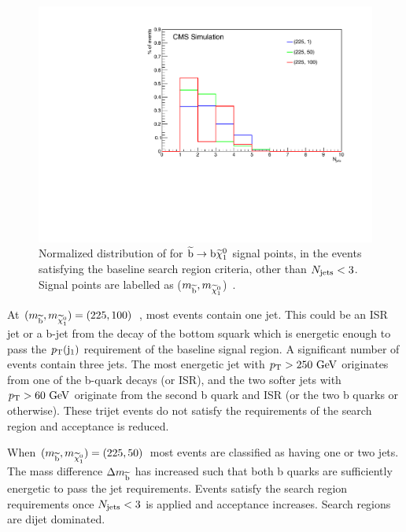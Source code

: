 \begin{figure}[!Hhtb]
  \begin{center}
  \includegraphics[scale=0.39]{Figures/sus13009/Njets_225_Norm_mod.pdf}
  \caption{Normalized distribution of \njets for $\widetilde{{\rm b}} \rightarrow {\rm b} \widetilde{\chi}^{0}_{1}$ signal points, in the events satisfying the baseline search region criteria, other than $N_{\text{jets}}<3$. Signal points are labelled as ($m_{\widetilde{{\rm b}}}, m_{\widetilde{\chi}^{0}_{1}}$)~\GeV.}
  \label{fig:sbot225njets}
  \end{center}
\end{figure}

At $(m_{\widetilde{{\rm b}}},m_{\widetilde{\chi}^{0}_{1}}) = (225, 100)$~\GeV, most events contain one jet. 
This could be an \ac{ISR} jet or a b-jet from the decay of the bottom squark which is energetic enough to pass the $p_{\text{T}}({\rm j}_1)$ requirement of the baseline signal region.
A significant number of events contain three jets. 
The most energetic jet with $p_{\text{T}}>250~\mathrm{GeV}$ originates from one of the b-quark decays (or \ac{ISR}), and the two softer jets with $p_{\text{T}}>60~\mathrm{GeV}$ originate from the second b quark and \ac{ISR} (or the two b quarks or otherwise). 
These trijet events do not satisfy the requirements of the search region and acceptance is reduced. 

When $(m_{\widetilde{{\rm b}}},m_{\widetilde{\chi}^{0}_{1}}) = (225, 50)$~\GeV most events are classified as having one or two jets. 
The mass difference $\Delta m_{\widetilde{{\rm b}}}$ has increased such that both b quarks are sufficiently energetic to pass the jet requirements. 
Events satisfy the search region requirements once $N_{\text{jets}}<3$ is applied and acceptance increases. 
Search regions are dijet dominated. 

